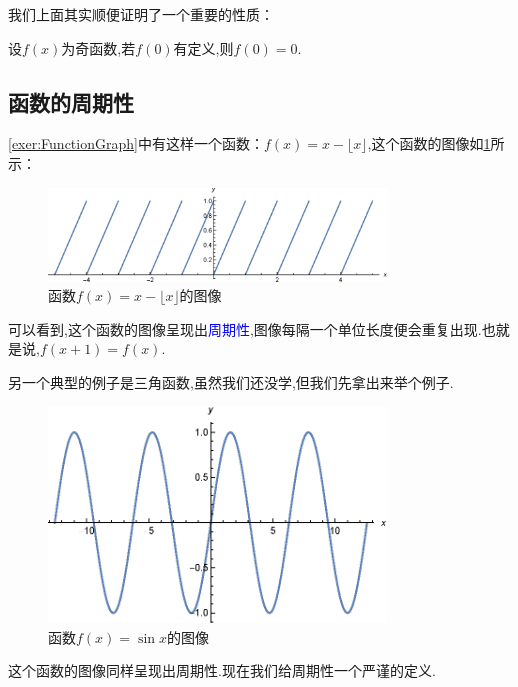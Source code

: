 \documentclass[lang=cn,math=cm,chinesefont=nofont,11pt,scheme=chinese,twocol]{elegantbook}
\begin{document}
我们上面其实顺便证明了一个重要的性质：

\begin{property}
  设$f(x)$为奇函数,若$f(0)$有定义,则$f(0)=0$.
\end{property}

\subsection{函数的周期性}

\ref{exer:FunctionGraph}中有这样一个函数：$f(x)=x-\lfloor x\rfloor$,这个函数的图像如\ref{2.2.4function1}所示：

\begin{figure}[h]
  \centering
  \includegraphics[width=0.8\textwidth]{image/2.2.4function1.eps}
  \caption{函数$f(x)=x-\lfloor x\rfloor$的图像}
  \label{2.2.4function1}
\end{figure}

可以看到,这个函数的图像呈现出\textcolor{blue}{周期性},图像每隔一个单位长度便会重复出现.也就是说,$f(x+1)=f(x)$.

另一个典型的例子是三角函数,虽然我们还没学,但我们先拿出来举个例子.

\begin{figure}[h]
  \centering
  \includegraphics[width=0.8\textwidth]{image/2.2.4function2.eps}
  \caption{函数$f(x)=\sin x$的图像}
  \label{2.2.4function2}
\end{figure}

这个函数的图像同样呈现出周期性.现在我们给周期性一个严谨的定义.
\end{document}
